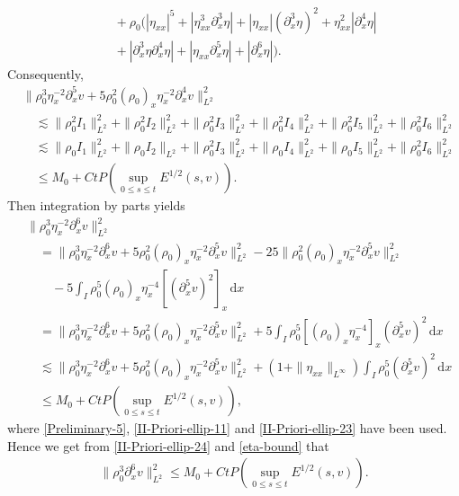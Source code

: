 \documentclass[11pt, reqno]{amsart}
\newcommand{\diff}{\mathrm{d}}
\numberwithin{equation}{section}
\begin{document}
{{\begin{equation*}
\begin{aligned}
&\quad+\rho_0(|\eta_{xx}|^5+|\eta_{xx}^3\partial_x^3\eta|+|\eta_{xx}|(\partial_x^3\eta)^2+\eta_{xx}^2|\partial_x^4\eta|\\
&\quad+|\partial_x^3\eta\partial_x^4\eta|+|\eta_{xx}\partial_x^5\eta|+|\partial_x^6\eta|).
\end{aligned}
\end{equation*}}
Consequently,
{\small \begin{equation}\label{II-Priori-ellip-23}
\begin{aligned}
&\|\rho_0^3\eta_x^{-2}\partial_x^5v+5\rho_0^2(\rho_0)_x\eta_x^{-2}\partial_x^4v\|_{L^2}^2\\
&\quad\lesssim \|\rho_0^2I_1\|_{L^2}^2+\|\rho_0^2I_2\|_{L^2}^2+\|\rho_0^2I_3\|_{L^2}^2+\|\rho_0^2I_4\|_{L^2}^2+\|\rho_0^2I_5\|_{L^2}^2+\|\rho_0^2I_6\|_{L^2}^2\\
&\quad\lesssim \|\rho_0I_1\|_{L^2}^2+\|\rho_0I_2\|_{L^2}+\|\rho_0^2I_3\|_{L^2}^2+\|\rho_0I_4\|_{L^2}^2+\|\rho_0I_5\|_{L^2}^2+\|\rho_0^2I_6\|_{L^2}^2\\
&\quad\leq M_0+Ct P(\sup_{0\leq s\leq t}E^{1/2}(s,v)).
\end{aligned}
\end{equation}}
Then integration by parts yields
{\small \begin{equation}\label{II-Priori-ellip-24}
\begin{aligned}
&\|\rho_0^3\eta_x^{-2}\partial_x^6v\|_{L^2}^2\\
&\quad=\|\rho_0^3\eta_x^{-2}\partial_x^6v
+5\rho_0^2(\rho_0)_x\eta_x^{-2}\partial_x^5v\|_{L^2}^2
-25\|\rho_0^2(\rho_0)_x\eta_x^{-2}\partial_x^5v\|_{L^2}^2\\
&\qquad-5\int_I\rho_0^5(\rho_0)_x\eta_x^{-4}[(\partial_x^5v)^2]_x\,\diff x\\
&\quad=\|\rho_0^3\eta_x^{-2}\partial_x^6v
+5\rho_0^2(\rho_0)_x\eta_x^{-2}\partial_x^5v\|_{L^2}^2
+5\int_I\rho_0^5[(\rho_0)_x\eta_x^{-4}]_{x}(\partial_x^5v)^2\,\diff x\\
&\quad\lesssim\|\rho_0^3\eta_x^{-2}\partial_x^6v
+5\rho_0^2(\rho_0)_x\eta_x^{-2}\partial_x^5v\|_{L^2}^2
+(1+\|\eta_{xx}\|_{L^\infty})
\int_I\rho_0^5(\partial_x^5v)^2\,\diff x\\
&\quad\leq M_0+Ct P(\sup_{0\leq s\leq t}E^{1/2}(s,v)),
\end{aligned}
\end{equation}}
where \eqref{Preliminary-5}, \eqref{II-Priori-ellip-11} and \eqref{II-Priori-ellip-23} have been used.
Hence we get from \eqref{II-Priori-ellip-24} and \eqref{eta-bound} that
\begin{equation}\label{II-Priori-ellip-25}
\begin{aligned}
\|\rho_0^3\partial_x^6v\|_{L^2}^2\leq M_0+Ct P(\sup_{0\leq s\leq t}E^{1/2}(s,v)).
\end{aligned}
\end{equation}





}
\end{document}
